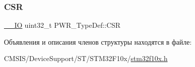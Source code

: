 \subsubsection{\texorpdfstring{CSR}{CSR}}
{\footnotesize\ttfamily \mbox{\hyperlink{group___c_m_s_i_s___c_m3__core__definitions_gaec43007d9998a0a0e01faede4133d6be}{\+\_\+\+\_\+\+IO}} uint32\+\_\+t P\+W\+R\+\_\+\+Type\+Def\+::\+C\+SR}



Объявления и описания членов структуры находятся в файле\+:\begin{DoxyCompactItemize}
\item 
C\+M\+S\+I\+S/\+Device\+Support/\+S\+T/\+S\+T\+M32\+F10x/\mbox{\hyperlink{stm32f10x_8h}{stm32f10x.\+h}}\end{DoxyCompactItemize}
